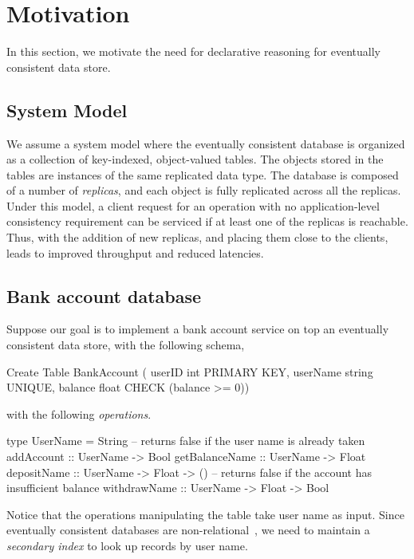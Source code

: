 \section{Motivation}

In this section, we motivate the need for declarative reasoning for eventually
consistent data store.

\subsection{System Model}

We assume a system model where the eventually consistent database is organized
as a collection of key-indexed, object-valued tables. The objects stored in the
tables are instances of the same replicated data type. The database is composed
of a number of \emph{replicas}, and each object is fully replicated across all
the replicas. Under this model, a client request for an operation with no
application-level consistency requirement can be serviced if at least one of
the replicas is reachable. Thus, with the addition of new replicas, and placing
them close to the clients, leads to improved throughput and reduced latencies.

\subsection{Bank account database}

Suppose our goal is to implement a bank account service on top an eventually
consistent data store, with the following schema,

\begin{codesql}
Create Table BankAccount (
  userID int PRIMARY KEY,
  userName string UNIQUE,
  balance float CHECK (balance >= 0))
\end{codesql}

\noindent with the following \emph{operations}.

\begin{codehaskell}
type UserName = String
-- returns false if the user name is already taken
addAccount     :: UserName -> Bool
getBalanceName :: UserName -> Float
depositName    :: UserName -> Float -> ()
-- returns false if the account has insufficient balance
withdrawName   :: UserName -> Float -> Bool
\end{codehaskell}

Notice that the operations manipulating the table take user name as input.
Since eventually consistent databases are non-relational~\cite{}, we need to
maintain a \emph{secondary index} to look up records by user name.


